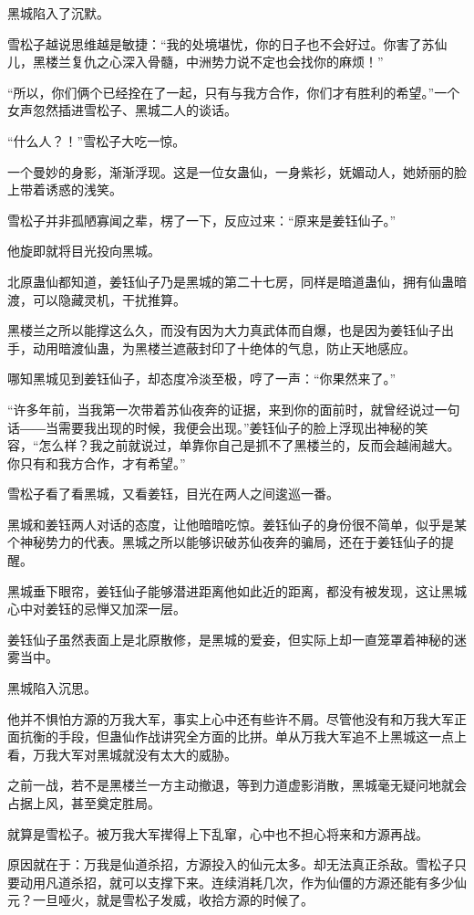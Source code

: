 \begin{this_body}
黑城陷入了沉默。

雪松子越说思维越是敏捷：“我的处境堪忧，你的日子也不会好过。你害了苏仙儿，黑楼兰复仇之心深入骨髓，中洲势力说不定也会找你的麻烦！”

“所以，你们俩个已经拴在了一起，只有与我方合作，你们才有胜利的希望。”一个女声忽然插进雪松子、黑城二人的谈话。

“什么人？！”雪松子大吃一惊。

一个曼妙的身影，渐渐浮现。这是一位女蛊仙，一身紫衫，妩媚动人，她娇丽的脸上带着诱惑的浅笑。

雪松子并非孤陋寡闻之辈，楞了一下，反应过来：“原来是姜钰仙子。”

他旋即就将目光投向黑城。

北原蛊仙都知道，姜钰仙子乃是黑城的第二十七房，同样是暗道蛊仙，拥有仙蛊暗渡，可以隐藏灵机，干扰推算。

黑楼兰之所以能撑这么久，而没有因为大力真武体而自爆，也是因为姜钰仙子出手，动用暗渡仙蛊，为黑楼兰遮蔽封印了十绝体的气息，防止天地感应。

哪知黑城见到姜钰仙子，却态度冷淡至极，哼了一声：“你果然来了。”

“许多年前，当我第一次带着苏仙夜奔的证据，来到你的面前时，就曾经说过一句话――当需要我出现的时候，我便会出现。”姜钰仙子的脸上浮现出神秘的笑容，“怎么样？我之前就说过，单靠你自己是抓不了黑楼兰的，反而会越闹越大。你只有和我方合作，才有希望。”

雪松子看了看黑城，又看姜钰，目光在两人之间逡巡一番。

黑城和姜钰两人对话的态度，让他暗暗吃惊。姜钰仙子的身份很不简单，似乎是某个神秘势力的代表。黑城之所以能够识破苏仙夜奔的骗局，还在于姜钰仙子的提醒。

黑城垂下眼帘，姜钰仙子能够潜进距离他如此近的距离，都没有被发现，这让黑城心中对姜钰的忌惮又加深一层。

姜钰仙子虽然表面上是北原散修，是黑城的爱妾，但实际上却一直笼罩着神秘的迷雾当中。

黑城陷入沉思。

他并不惧怕方源的万我大军，事实上心中还有些许不屑。尽管他没有和万我大军正面抗衡的手段，但蛊仙作战讲究全方面的比拼。单从万我大军追不上黑城这一点上看，万我大军对黑城就没有太大的威胁。

之前一战，若不是黑楼兰一方主动撤退，等到力道虚影消散，黑城毫无疑问地就会占据上风，甚至奠定胜局。

就算是雪松子。被万我大军撵得上下乱窜，心中也不担心将来和方源再战。

原因就在于：万我是仙道杀招，方源投入的仙元太多。却无法真正杀敌。雪松子只要动用凡道杀招，就可以支撑下来。连续消耗几次，作为仙僵的方源还能有多少仙元？一旦哑火，就是雪松子发威，收拾方源的时候了。


\end{this_body}
